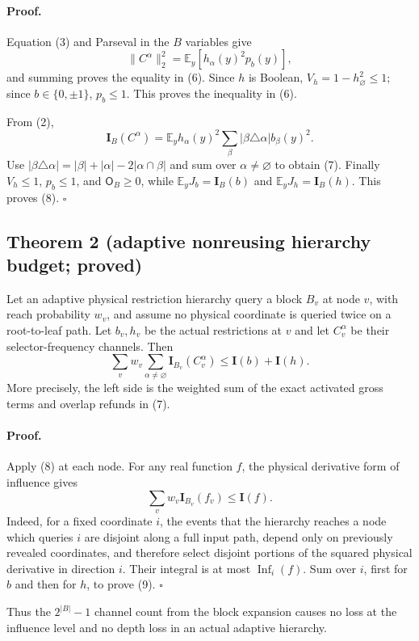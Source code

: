 \paragraph{Proof.}
Equation (3) and Parseval in the $B$ variables give
\[
 \lVert C^\alpha\rVert_2^2
 =\mathbb E_y\left[h_\alpha(y)^2p_b(y)\right],
\]
and summing proves the equality in (6).  Since $h$ is Boolean,
$V_h=1-h_\varnothing^2\le1$; since $b\in\{0,\pm1\}$, $p_b\le1$.  This proves
the inequality in (6).

From (2),
\[
 \mathbf I_B(C^\alpha)
 =\mathbb E_y h_\alpha(y)^2
       \sum_\beta|\beta\triangle\alpha|b_\beta(y)^2.
\]
Use
$|\beta\triangle\alpha|=|\beta|+|\alpha|-2|\alpha\cap\beta|$
and sum over $\alpha\ne\varnothing$ to obtain (7).  Finally
$V_h\le1$, $p_b\le1$, and $\mathsf O_B\ge0$, while
$\mathbb E_yJ_b=\mathbf I_B(b)$ and
$\mathbb E_yJ_h=\mathbf I_B(h)$.  This proves (8). \(\square\)

\subsection*{Theorem 2 (adaptive nonreusing hierarchy budget; proved)}

Let an adaptive physical restriction hierarchy query a block $B_v$ at node
$v$, with reach probability $w_v$, and assume no physical coordinate is
queried twice on a root-to-leaf path.  Let $b_v,h_v$ be the actual
restrictions at $v$ and let $C_v^\alpha$ be their selector-frequency
channels.  Then
\[
 \boxed{
 \sum_vw_v\sum_{\alpha\ne\varnothing}
        \mathbf I_{B_v}(C_v^\alpha)
 \le \mathbf I(b)+\mathbf I(h).}
\tag{9}
\]
More precisely, the left side is the weighted sum of the exact activated
gross terms and overlap refunds in (7).

\paragraph{Proof.}
Apply (8) at each node.  For any real function $f$, the physical derivative
form of influence gives
\[
 \sum_vw_v\mathbf I_{B_v}(f_v)\le\mathbf I(f).
\tag{10}
\]
Indeed, for a fixed coordinate $i$, the events that the hierarchy reaches a
node which queries $i$ are disjoint along a full input path, depend only on
previously revealed coordinates, and therefore select disjoint portions of
the squared physical derivative in direction $i$.  Their integral is at
most $\operatorname{Inf}_i(f)$.  Sum over $i$, first for $b$ and then for
$h$, to prove (9). \(\square\)

Thus the $2^{|B|}-1$ channel count from the block expansion causes no loss at
the influence level and no depth loss in an actual adaptive hierarchy.

